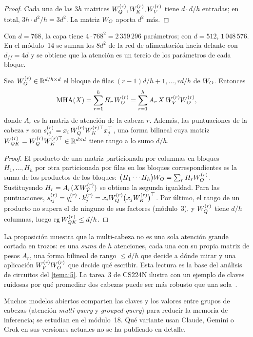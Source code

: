 \begin{proof}
Cada una de las $3h$ matrices $W_{Q}^{(r)},W_{K}^{(r)},W_{V}^{(r)}$ tiene $d\cdot d/h$ entradas; en total, $3h\cdot d^{2}/h=3d^{2}$. La matriz $W_{O}$ aporta $d^{2}$ más.
\end{proof}

Con $d=768$, la capa tiene $4\cdot 768^{2}=2\,359\,296$ parámetros; con $d=512$, $1\,048\,576$. En el módulo~14 se suman los $8d^{2}$ de la red de alimentación hacia delante con $d_{ff}=4d$ y se obtiene que la atención es un tercio de los parámetros de cada bloque.

\begin{proposicion}\label{prop:descomp}
Sea $W_{O}^{(r)}\in\mathbb{R}^{d/h\times d}$ el bloque de filas $(r-1)d/h+1,\dots,rd/h$ de $W_{O}$. Entonces
\[
\operatorname{MHA}(X)=\sum_{r=1}^{h}H_r\,W_{O}^{(r)}=\sum_{r=1}^{h}A_r\,X\,W_{V}^{(r)}W_{O}^{(r)},
\]
donde $A_r$ es la matriz de atención de la cabeza $r$. Además, las puntuaciones de la cabeza $r$ son $s^{(r)}_{ij}=x_i\,W_{Q}^{(r)}W_{K}^{(r)\top}x_j^{\top}$, una forma bilineal cuya matriz $W_{QK}^{(r)}=W_{Q}^{(r)}W_{K}^{(r)\top}\in\mathbb{R}^{d\times d}$ tiene rango a lo sumo $d/h$.
\end{proposicion}

\begin{proof}
El producto de una matriz particionada por columnas en bloques $H_1,\dots,H_h$ por otra particionada por filas en los bloques correspondientes es la suma de los productos de los bloques: $\bigl(H_1\cdots H_h\bigr)W_{O}=\sum_rH_rW_{O}^{(r)}$. Sustituyendo $H_r=A_r(XW_{V}^{(r)})$ se obtiene la segunda igualdad. Para las puntuaciones, $s^{(r)}_{ij}=q^{(r)}_i\cdot k^{(r)}_j=x_iW_{Q}^{(r)}\bigl(x_jW_{K}^{(r)}\bigr)^{\top}$. Por último, el rango de un producto no supera el de ninguno de sus factores (módulo~3), y $W_{Q}^{(r)}$ tiene $d/h$ columnas, luego $\operatorname{rg} W_{QK}^{(r)}\le d/h$.
\end{proof}

La proposición muestra que la multi-cabeza no es una sola atención grande cortada en trozos: es una \emph{suma} de $h$ atenciones, cada una con su propia matriz de pesos $A_r$, una forma bilineal de rango $\le d/h$ que decide a dónde mirar y una aplicación $W_{V}^{(r)}W_{O}^{(r)}$ que decide qué escribir. Esta lectura es la base del análisis de circuitos del \cref{tema:5}. La tarea~3 de CS224N ilustra con un ejemplo de claves ruidosas por qué promediar dos cabezas puede ser más robusto que una sola~\cite[tarea~3, pregunta~1]{cs224n}.

\begin{observacion}[Variantes]
Muchos modelos abiertos comparten las claves y los valores entre grupos de cabezas (atención \emph{multi-query} y \emph{grouped-query}) para reducir la memoria de inferencia; se estudian en el módulo~18. Qué variante usan Claude, Gemini o Grok en sus versiones actuales no se ha publicado en detalle.
\end{observacion}

